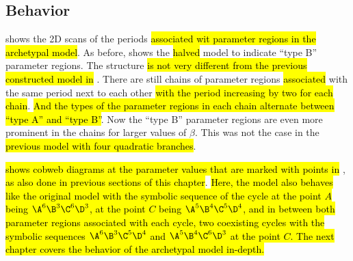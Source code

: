 \subsection{Behavior}
\label{sec:setup.arch.behavior}

 shows the 2D scans of the periods \hl{associated wit parameter regions in the archetypal model}.
As before,  shows the \hl{halved} model to indicate ``type B'' parameter regions.
The structure \hl{is not very different from the previous constructed model in} .
There are still chains of parameter regions \hl{associated} with the same period next to each other \hl{with the period increasing by two for each chain}.
\hl{And the types of the parameter regions in each chain alternate between ``type A'' and ``type B''}.
Now the ``type B'' parameter regions are even more prominent in the chains for larger values of $\beta$.
This was not the case in the \hl{previous model with four quadratic branches}.

 \hl{shows cobweb diagrams at the parameter values that are marked with points in} , \hl{as also done in previous sections of this chapter}.
\hl{
	Here, the model also behaves like the original model with the symbolic sequence of the cycle at the point $A$ being $\A^6\B^3\C^6\D^3$, at the point $C$ being $\A^5\B^4\C^5\D^4$, and in between both parameter regions associated with each cycle, two coexisting cycles with the symbolic sequences $\A^6\B^3\C^5\D^4$ and $\A^5\B^4\C^6\D^3$ at the point $C$.
	The next chapter covers the behavior of the archetypal model in-depth.
}

